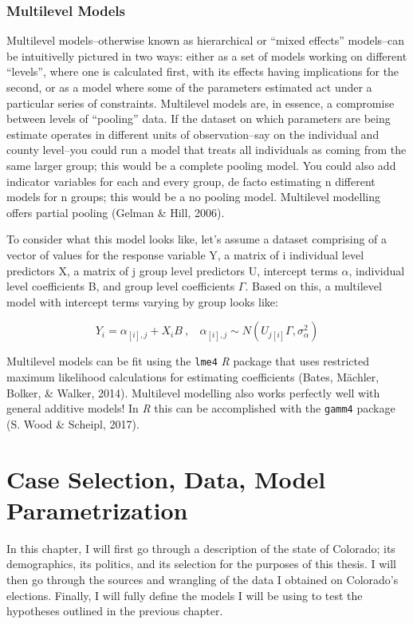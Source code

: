 \documentclass[12pt,twoside]{reedthesis}
\begin{document}
  \subsection{Multilevel Models}\label{multilevel-models}
  
  Multilevel models--otherwise known as hierarchical or ``mixed effects''
  models--can be intuitivelly pictured in two ways: either as a set of
  models working on different ``levels'', where one is calculated first,
  with its effects having implications for the second, or as a model where
  some of the parameters estimated act under a particular series of
  constraints. Multilevel models are, in essence, a compromise between
  levels of ``pooling'' data. If the dataset on which parameters are being
  estimate operates in different units of observation--say on the
  individual and county level--you could run a model that treats all
  individuals as coming from the same larger group; this would be a
  complete pooling model. You could also add indicator variables for each
  and every group, de facto estimating n different models for n groups;
  this would be a no pooling model. Multilevel modelling offers partial
  pooling (Gelman \& Hill, 2006).
  
  To consider what this model looks like, let's assume a dataset
  comprising of a vector of values for the response variable Y, a matrix
  of i individual level predictors X, a matrix of j group level predictors
  U, intercept terms \(\alpha\), individual level coefficients B, and
  group level coefficients \(\Gamma\). Based on this, a multilevel model
  with intercept terms varying by group looks like:
  
  \[Y_i = \alpha_{[i], j} + X_iB~,~~~~\alpha_{[i], j} \sim N(U_{j[i]}\Gamma, \sigma_{\alpha}^2)\]
  
  Multilevel models can be fit using the \texttt{lme4} \textit{R} package
  that uses restricted maximum likelihood calculations for estimating
  coefficients (Bates, Mächler, Bolker, \& Walker, 2014). Multilevel
  modelling also works perfectly well with general additive models! In
  \textit{R} this can be accomplished with the \texttt{gamm4} package (S.
  Wood \& Scheipl, 2017).
  
  \chapter{Case Selection, Data, Model
  Parametrization}\label{case-selection-data-model-parametrization}
  
  In this chapter, I will first go through a description of the state of
  Colorado; its demographics, its politics, and its selection for the
  purposes of this thesis. I will then go through the sources and
  wrangling of the data I obtained on Colorado's elections. Finally, I
  will fully define the models I will be using to test the hypotheses
  outlined in the previous chapter.
  
\end{document}
